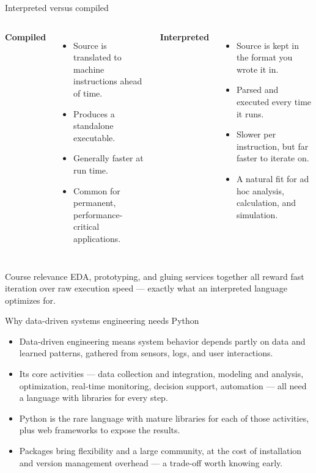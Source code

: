 \begin{frame}{Interpreted versus compiled}
\begin{columns}[T]
\textbf{Compiled}
\begin{itemize}
\item Source is translated to machine instructions ahead of time.
\item Produces a standalone executable.
\item Generally faster at run time.
\item Common for permanent, performance-critical applications.
\end{itemize}
\textbf{Interpreted}
\begin{itemize}
\item Source is kept in the format you wrote it in.
\item Parsed and executed every time it runs.
\item Slower per instruction, but far faster to iterate on.
\item A natural fit for ad hoc analysis, calculation, and simulation.
\end{itemize}
\end{columns}
\vspace{0.5em}
\begin{block}{Course relevance}
EDA, prototyping, and gluing services together all reward fast iteration over raw execution speed --- exactly what an interpreted language optimizes for.
\end{block}
\coursefooter
\end{frame}

\begin{frame}{Why data-driven systems engineering needs Python}
\begin{itemize}
\item Data-driven engineering means system behavior depends partly on data and learned patterns, gathered from sensors, logs, and user interactions.
\item Its core activities --- data collection and integration, modeling and analysis, optimization, real-time monitoring, decision support, automation --- all need a language with libraries for every step.
\item Python is the rare language with mature libraries for each of those activities, plus web frameworks to expose the results.
\item Packages bring flexibility and a large community, at the cost of installation and version management overhead --- a trade-off worth knowing early.
\end{itemize}
\coursefooter
\end{frame}

